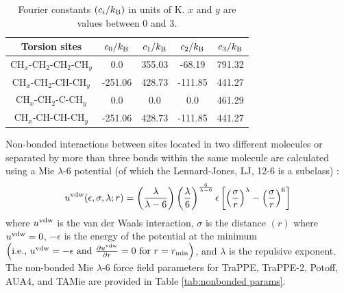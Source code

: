 \documentclass[preprint,review,12pt]{elsarticle}
\begin{document}
	\begin{table}[h!]
		\caption{Fourier constants $(c_i/k_{\rm B})$ in units of K. $x$ and $y$ are values between 0 and 3.} \label{tab:torsions}
		\begin{center}
			\begin{tabular}{|c|c|c|c|c|}
				\hline
				Torsion sites & $c_0/k_{\rm B}$ & $c_1/k_{\rm B}$ & $c_2/k_{\rm B}$ & $c_3/k_{\rm B}$ \\ \hline
				CH$_x$-CH$_2$-CH$_2$-CH$_y$ & 0.0 & 355.03 & -68.19 & 791.32 \\ 
				CH$_x$-CH$_2$-CH-CH$_y$ & -251.06 & 428.73 & -111.85 & 441.27 \\
				CH$_x$-CH$_2$-C-CH$_y$ & 0.0 & 0.0 & 0.0 & 461.29 \\
				CH$_x$-CH-CH-CH$_y$ & -251.06 & 428.73 & -111.85 & 441.27 \\
				\hline
			\end{tabular}
		\end{center} 
	\end{table}

	Non-bonded interactions between sites located in two different molecules or separated by more than three bonds within the same molecule are calculated using a Mie $\lambda$-6 potential (of which the Lennard-Jones, LJ, 12-6 is a subclass) \cite{Herdes2015}:
	\begin{equation} \label{eq:Mie}
	u^{\rm vdw}(\epsilon,\sigma,\lambda;r) = \left(\frac{\lambda}{\lambda - 6}\right)\left(\frac{\lambda}{6}\right)^{\frac{6}{\lambda - 6}} \epsilon \left[\left(\frac{\sigma}{r}\right)^{\lambda} - \left(\frac{\sigma}{r}\right)^6\right]
	\end{equation} 
	where $u^{\rm vdw}$ is the van der Waals interaction, $\sigma$ is the distance $(r)$ where $u^{\rm vdw} = 0$, $-\epsilon$ is the energy of the potential at the minimum $\left(\text{i.e., }u^{\rm vdw} = -\epsilon \text{ and } \frac{\partial u^{\rm vdw}}{\partial r} = 0 \text{ for } r=r_{\rm min} \right)$, and $\lambda$ is the repulsive exponent. The non-bonded Mie $\lambda$-6 force field parameters for TraPPE, TraPPE-2, Potoff, AUA4, and TAMie are provided in Table \ref{tab:nonbonded params}. 
	
\end{document}
